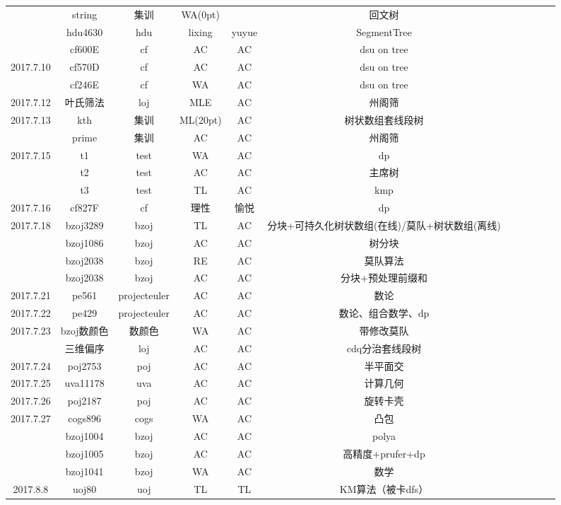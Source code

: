 \documentclass[landscape]{article}
\begin{document}
\begin{longtable}{ccccccccccc}
   & string & 集训 & WA(0pt) & \color{pink}{WA(0pt)} & 回文树\\
   & hdu4630 & hdu & lixing & yuyue & SegmentTree\\
   & cf600E & cf & AC & AC & dsu on tree\\
  \hline 
  2017.7.10 & cf570D & cf & AC & AC & dsu on tree\\
   & cf246E & cf & WA & AC & dsu on tree\\
  \hline
  2017.7.12 & 叶氏筛法 & loj & MLE & AC & 州阁筛\\
  \hline
  2017.7.13 & kth & 集训 & ML(20pt) & AC & 树状数组套线段树\\
   & prime & 集训 & AC & AC & 州阁筛\\
  \hline
  2017.7.15 & t1 & test & WA & AC & dp\\
   & t2 & test & AC & AC & 主席树\\
   & t3 & test & TL & AC & kmp\\
  \hline
  2017.7.16 & cf827F & cf & 理性 & 愉悦 & dp\\
  \hline
  2017.7.18 & bzoj3289 & bzoj & TL & AC & 分块+可持久化树状数组(在线)/莫队+树状数组(离线)\\
   & bzoj1086 & bzoj & AC & AC & 树分块\\
   & bzoj2038 & bzoj & RE & AC & 莫队算法\\
   & bzoj2038 & bzoj & AC & AC & 分块+预处理前缀和\\
  \hline
  2017.7.21 & pe561 & projecteuler & AC & AC & 数论\\
  \hline
  2017.7.22 & pe429 & projecteuler & AC & AC & 数论、组合数学、dp\\
  \hline
  2017.7.23 & bzoj数颜色 & 数颜色 & WA & AC & 带修改莫队\\
   & 三维偏序 & loj & AC & AC & cdq分治套线段树\\
  \hline
  2017.7.24 & poj2753 & poj & AC & AC & 半平面交\\
  \hline
  2017.7.25 & uva11178 & uva & AC & AC & 计算几何\\
  \hline
  2017.7.26 & poj2187 & poj & AC & AC & 旋转卡壳\\
  \hline
  2017.7.27 & cogs896 & cogs & WA & AC & 凸包\\
   & bzoj1004 & bzoj & AC & AC & polya\\
   & bzoj1005 & bzoj & AC & AC & 高精度+prufer+dp\\
   & bzoj1041 & bzoj & WA & AC & 数学\\
  \hline
  2017.8.8 & uoj80 & uoj & TL & TL & KM算法（被卡dfs）\\

\end{longtable}
\end{document}
